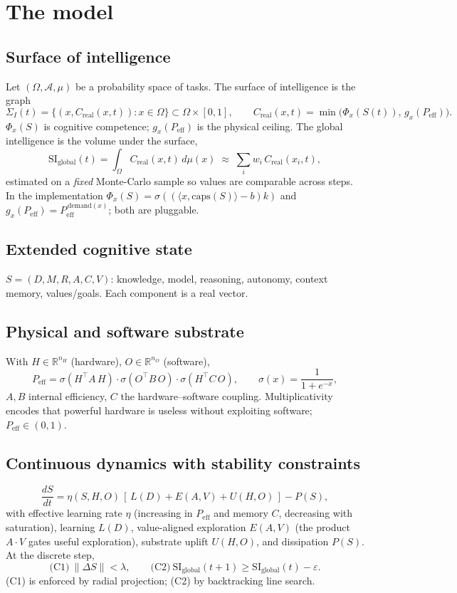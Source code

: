 \documentclass[11pt]{article}
\newcommand{\SI}{\mathrm{SI}_{\text{global}}}
\newcommand{\Peff}{P_{\text{eff}}}
\newcommand{\Creal}{C_{\text{real}}}
\begin{document}
\section{The model}

\subsection{Surface of intelligence}
Let $(\Omega,\mathcal{A},\mu)$ be a probability space of tasks. The surface of
intelligence is the graph
\[
\Sigma_I(t)=\{(x,\Creal(x,t)) : x\in\Omega\}\subset\Omega\times[0,1],
\qquad
\Creal(x,t)=\min\!\big(\Phi_x(S(t)),\,g_x(\Peff)\big).
\]
$\Phi_x(S)$ is cognitive competence; $g_x(\Peff)$ is the physical ceiling. The
global intelligence is the volume under the surface,
\[
\SI(t)=\int_\Omega \Creal(x,t)\,d\mu(x)\;\approx\;\sum_i w_i\,\Creal(x_i,t),
\]
estimated on a \emph{fixed} Monte-Carlo sample so values are comparable across
steps. In the implementation $\Phi_x(S)=\sigma((\langle x,\mathrm{caps}(S)\rangle-b)k)$
and $g_x(\Peff)=\Peff^{\,\mathrm{demand}(x)}$; both are pluggable.

\subsection{Extended cognitive state}
$S=(D,M,R,A,C,V)$: knowledge, model, reasoning, autonomy, context memory,
values/goals. Each component is a real vector.

\subsection{Physical and software substrate}
With $H\in\mathbb{R}^{n_H}$ (hardware), $O\in\mathbb{R}^{n_O}$ (software),
\[
\Peff=\sigma(H^\top A\,H)\cdot\sigma(O^\top B\,O)\cdot\sigma(H^\top C\,O),
\qquad \sigma(x)=\frac{1}{1+e^{-x}},
\]
$A,B$ internal efficiency, $C$ the hardware--software coupling. Multiplicativity
encodes that powerful hardware is useless without exploiting software;
$\Peff\in(0,1)$.

\subsection{Continuous dynamics with stability constraints}
\[
\frac{dS}{dt}=\eta(S,H,O)\,[\,L(D)+E(A,V)+U(H,O)\,]-P(S),
\]
with effective learning rate $\eta$ (increasing in $\Peff$ and memory $C$,
decreasing with saturation), learning $L(D)$, value-aligned exploration
$E(A,V)$ (the product $A\!\cdot\!V$ gates useful exploration), substrate uplift
$U(H,O)$, and dissipation $P(S)$. At the discrete step,
\[
\text{(C1)}\ \lVert\Delta S\rVert<\lambda, \qquad
\text{(C2)}\ \SI(t{+}1)\ge\SI(t)-\varepsilon.
\]
(C1) is enforced by radial projection; (C2) by backtracking line search.
\end{document}
